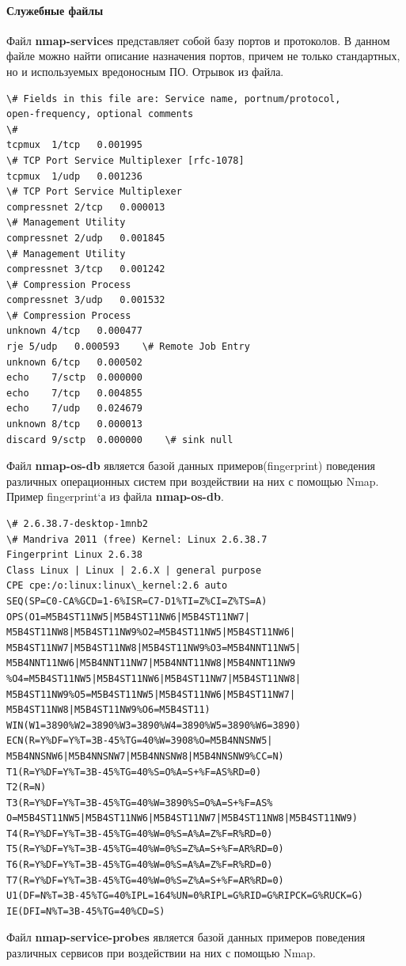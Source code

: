 \documentclass[a4paper, 14pt]{article}				%
\begin{document}
\paragraph{Служебные файлы\\}
Файл \textbf{nmap-services} представляет собой базу портов и протоколов. В данном файле можно найти описание назначения портов, причем не только стандартных, но и используемых вредоносным ПО. Отрывок из файла.
\begin{Verbatim}[frame=single]
\# Fields in this file are: Service name, portnum/protocol, 
open-frequency, optional comments
\#
tcpmux	1/tcp	0.001995	
\# TCP Port Service Multiplexer [rfc-1078]
tcpmux	1/udp	0.001236	
\# TCP Port Service Multiplexer
compressnet	2/tcp	0.000013	
\# Management Utility
compressnet	2/udp	0.001845
\# Management Utility
compressnet	3/tcp	0.001242
\# Compression Process
compressnet	3/udp	0.001532	
\# Compression Process
unknown	4/tcp	0.000477
rje	5/udp	0.000593	\# Remote Job Entry
unknown	6/tcp	0.000502
echo	7/sctp	0.000000
echo	7/tcp	0.004855
echo	7/udp	0.024679
unknown	8/tcp	0.000013
discard	9/sctp	0.000000	\# sink null 
\end{Verbatim}

Файл \textbf{nmap-os-db} является базой данных примеров(fingerprint) поведения различных операционных систем при воздействии на них с помощью Nmap. Пример fingerprint`а из файла \textbf{nmap-os-db}.
\begin{Verbatim}[frame=single]
\# 2.6.38.7-desktop-1mnb2
\# Mandriva 2011 (free) Kernel: Linux 2.6.38.7
Fingerprint Linux 2.6.38
Class Linux | Linux | 2.6.X | general purpose
CPE cpe:/o:linux:linux\_kernel:2.6 auto
SEQ(SP=C0-CA%GCD=1-6%ISR=C7-D1%TI=Z%CI=Z%TS=A)
OPS(O1=M5B4ST11NW5|M5B4ST11NW6|M5B4ST11NW7|
M5B4ST11NW8|M5B4ST11NW9%O2=M5B4ST11NW5|M5B4ST11NW6|
M5B4ST11NW7|M5B4ST11NW8|M5B4ST11NW9%O3=M5B4NNT11NW5|
M5B4NNT11NW6|M5B4NNT11NW7|M5B4NNT11NW8|M5B4NNT11NW9
%O4=M5B4ST11NW5|M5B4ST11NW6|M5B4ST11NW7|M5B4ST11NW8|
M5B4ST11NW9%O5=M5B4ST11NW5|M5B4ST11NW6|M5B4ST11NW7|
M5B4ST11NW8|M5B4ST11NW9%O6=M5B4ST11)
WIN(W1=3890%W2=3890%W3=3890%W4=3890%W5=3890%W6=3890)
ECN(R=Y%DF=Y%T=3B-45%TG=40%W=3908%O=M5B4NNSNW5|
M5B4NNSNW6|M5B4NNSNW7|M5B4NNSNW8|M5B4NNSNW9%CC=N)
T1(R=Y%DF=Y%T=3B-45%TG=40%S=O%A=S+%F=AS%RD=0)
T2(R=N)
T3(R=Y%DF=Y%T=3B-45%TG=40%W=3890%S=O%A=S+%F=AS%
O=M5B4ST11NW5|M5B4ST11NW6|M5B4ST11NW7|M5B4ST11NW8|M5B4ST11NW9)
T4(R=Y%DF=Y%T=3B-45%TG=40%W=0%S=A%A=Z%F=R%RD=0)
T5(R=Y%DF=Y%T=3B-45%TG=40%W=0%S=Z%A=S+%F=AR%RD=0)
T6(R=Y%DF=Y%T=3B-45%TG=40%W=0%S=A%A=Z%F=R%RD=0)
T7(R=Y%DF=Y%T=3B-45%TG=40%W=0%S=Z%A=S+%F=AR%RD=0)
U1(DF=N%T=3B-45%TG=40%IPL=164%UN=0%RIPL=G%RID=G%RIPCK=G%RUCK=G)
IE(DFI=N%T=3B-45%TG=40%CD=S) 
\end{Verbatim}
Файл \textbf{nmap-service-probes} является базой данных примеров поведения различных сервисов при воздействии на них с помощью Nmap.
\end{document}
